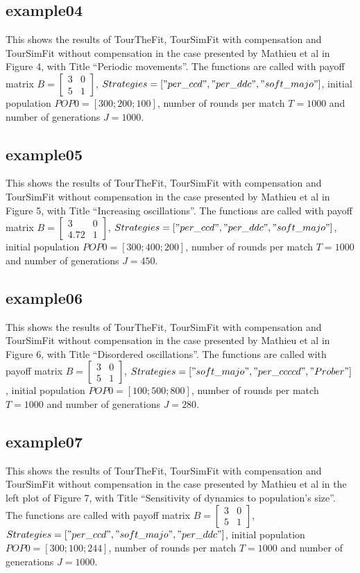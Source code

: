 \documentclass[12pt]{article}
\begin{document}
\subsection{example04}
This shows the results of TourTheFit, TourSimFit with compensation and TourSimFit without compensation in the case presented by Mathieu et al in Figure 4, with Title ``Periodic movements''. The functions are called with payoff matrix $B = \begin{bmatrix} 3 & 0 \\ 5 & 1 \end{bmatrix}$, $Strategies = ["per\_ccd", "per\_ddc", "soft\_majo"]$, initial population $POP0 = [300; 200; 100]$, number of rounds per match $T = 1000$ and number of generations $J = 1000$.

\subsection{example05}
This shows the results of TourTheFit, TourSimFit with compensation and TourSimFit without compensation in the case presented by Mathieu et al in Figure 5, with Title ``Increasing oscillations''. The functions are called with payoff matrix $B = \begin{bmatrix} 3 & 0 \\ 4.72 & 1 \end{bmatrix}$, $Strategies = ["per\_ccd", "per\_ddc", "soft\_majo"]$, initial population $POP0 = [300; 400; 200]$, number of rounds per match $T = 1000$ and number of generations $J = 450$.

\subsection{example06}
This shows the results of TourTheFit, TourSimFit with compensation and TourSimFit without compensation in the case presented by Mathieu et al in Figure 6, with Title ``Disordered oscillations''. The functions are called with payoff matrix $B = \begin{bmatrix} 3 & 0 \\ 5 & 1 \end{bmatrix}$, $Strategies = ["soft\_majo", "per\_ccccd", "Prober"]$, initial population $POP0 = [100; 500; 800]$, number of rounds per match $T = 1000$ and number of generations $J = 280$.

\subsection{example07}
This shows the results of TourTheFit, TourSimFit with compensation and TourSimFit without compensation in the case presented by Mathieu et al in the left plot of Figure 7, with Title ``Sensitivity of dynamics to population's size''. The functions are called with payoff matrix $B = \begin{bmatrix} 3 & 0 \\ 5 & 1 \end{bmatrix}$, $Strategies = ["per\_ccd", "soft\_majo", "per\_ddc"]$, initial population $POP0 = [300; 100; 244]$, number of rounds per match $T = 1000$ and number of generations $J = 1000$.
\end{document}
